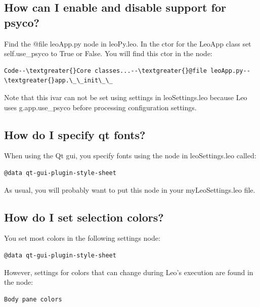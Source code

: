 \documentclass[a4paper,10pt,english]{sphinxmanual}
\begin{document}
\subsection{How can I enable and disable support for psyco?}
\label{FAQ:how-can-i-enable-and-disable-support-for-psyco}
Find the @file leoApp.py node in leoPy.leo.
In the ctor for the LeoApp class set self.use\_psyco to True or False.
You will find this ctor in the node:

\begin{Verbatim}[commandchars=\\\{\}]
Code--\textgreater{}Core classes...--\textgreater{}@file leoApp.py--\textgreater{}app.\_\_init\_\_
\end{Verbatim}

Note that this ivar can not be set using settings in leoSettings.leo because
Leo uses g.app.use\_psyco before processing configuration settings.


\subsection{How do I specify qt fonts?}
\label{FAQ:how-do-i-specify-qt-fonts}
When using the Qt gui, you specify fonts
using the node in leoSettings.leo called:

\begin{Verbatim}[commandchars=\\\{\}]
@data qt-gui-plugin-style-sheet
\end{Verbatim}

As usual, you will probably want to put this node in your myLeoSettings.leo file.


\subsection{How do I set selection colors?}
\label{FAQ:how-do-i-set-selection-colors}
You set most colors in the following settings node:

\begin{Verbatim}[commandchars=\\\{\}]
@data qt-gui-plugin-style-sheet
\end{Verbatim}

However, settings for colors that can change during Leo's execution
are found in the node:

\begin{Verbatim}[commandchars=\\\{\}]
Body pane colors
\end{Verbatim}
\end{document}
